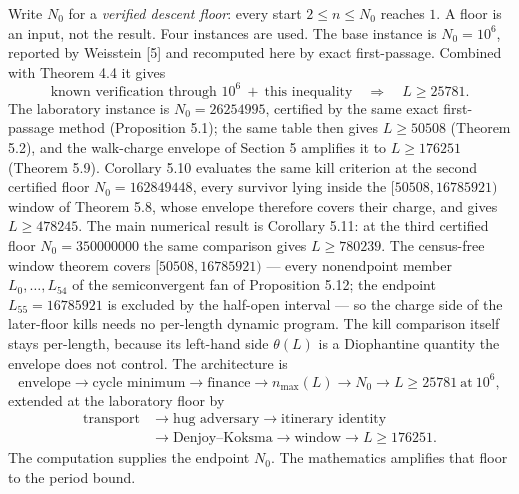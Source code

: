 \documentclass[12pt]{article}
\begin{document}
Write \(N_0\) for a \emph{verified descent floor}: every start
\(2\le n\le N_0\) reaches \(1\). A floor is an input, not the result.
Four instances are used. The base instance is \(N_0=10^6\), reported by
Weisstein {[}5{]} and recomputed here by exact first-passage. Combined
with Theorem 4.4 it gives \[
\text{known verification through }10^6
\ +\
\text{this inequality}
\quad\Rightarrow\quad
L\ge 25781.
\] The laboratory instance is \(N_0=26254995\), certified by the same
exact first-passage method (Proposition 5.1); the same table then gives
\(L\ge 50508\) (Theorem 5.2), and the walk-charge envelope of Section 5
amplifies it to \(L\ge 176251\) (Theorem 5.9). Corollary 5.10 evaluates
the same kill criterion at the second certified floor \(N_0=162849448\),
every survivor lying inside the \([50508,16785921)\) window of Theorem
5.8, whose envelope therefore covers their charge, and gives
\(L\ge 478245\). The main numerical result is Corollary 5.11: at the
third certified floor \(N_0=350000000\) the same comparison gives
\(L\ge 780239\). The census-free window theorem covers
\([50508,16785921)\) --- every nonendpoint member \(L_0,\ldots,L_{54}\)
of the semiconvergent fan of Proposition 5.12; the endpoint
\(L_{55}=16785921\) is excluded by the half-open interval --- so the
charge side of the later-floor kills needs no per-length dynamic
program. The kill comparison itself stays per-length, because its
left-hand side \(\theta(L)\) is a Diophantine quantity the envelope does
not control. The architecture is \[
\text{envelope}
\to
\text{cycle minimum}
\to
\text{finance}
\to
n_{\max}(L)
\to
N_0
\to
L\ge 25781\ \text{at}\ 10^6,
\] extended at the laboratory floor by \[
\begin{aligned}
\text{transport}&\to\text{hug adversary}\to\text{itinerary identity}\\
&\to\text{Denjoy--Koksma}\to\text{window}\to L\ge176251.
\end{aligned}
\] The computation supplies the endpoint \(N_0\). The mathematics
amplifies that floor to the period bound.
\end{document}
